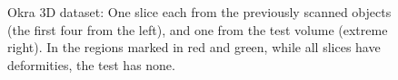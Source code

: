 \documentclass[journal]{IEEEtran}
\begin{document}
\begin{figure}[!h]
\begin{subfigure}[b]{0.18\linewidth}
\captionsetup{labelformat=empty}
        \caption{}
     \end{subfigure}
    \begin{subfigure}[b]{0.176\linewidth}
\captionsetup{labelformat=empty}
        \caption{}
     \end{subfigure}
     \caption{Okra 3D dataset: One slice each from the previously scanned objects (the
       first four from the left), and one from the test volume
       (extreme right). In the regions marked in red and green, while
       all slices have deformities, the test
       has none.}
\label{fig:object-prior_test_okra}
\end{figure}
\end{document}

